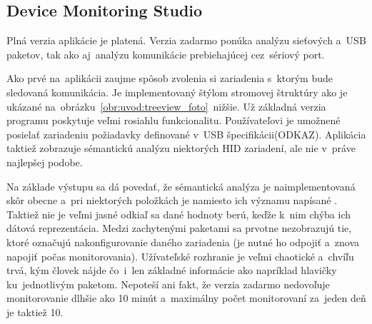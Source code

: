 \subsection*{Device Monitoring Studio}

Plná verzia aplikácie je platená. Verzia zadarmo ponúka analýzu sieťových a~USB paketov, tak ako aj~analýzu komunikácie prebiehajúcej cez~sériový port. 

Ako prvé na~aplikácii zaujme spôsob zvolenia si zariadenia s~ktorým bude sledovaná komunikácia. Je implementovaný štýlom stromovej štruktúry ako je ukázané na~obrázku~\ref{obr:uvod:treeview_foto}~nižšie. Už základná verzia programu poskytuje veľmi rosiahlu funkcionalitu. Používateľovi je umožnené posielať zariadeniu požiadavky definované v~USB špecifikácii(ODKAZ). Aplikácia taktiež zobrazuje sémantickú analýzu niektorých HID zariadení, ale nie v~práve najlepšej podobe. 

Na základe výstupu sa dá povedať, že sémantická analýza je naimplementovaná skôr obecne a~pri niektorých položkách je namiesto ich významu napísané . Taktiež nie je veľmi jasné odkiaľ sa dané hodnoty berú, keďže k~nim chýba ich dátová reprezentácia. Medzi zachytenými paketami sa prvotne nezobrazujú tie, ktoré označujú nakonfigurovanie daného zariadenia (je nutné ho odpojiť a~znova napojiť počas monitorovania). Užívateľské rozhranie je veľmi chaotické a~chvíľu trvá, kým človek nájde čo~i~len základné informácie ako napríklad hlavičky ku~jednotlivým paketom.  Nepoteší ani fakt, že verzia zadarmo nedovoľuje monitorovanie dlhšie ako 10 minút a~maximálny počet monitorovaní za~jeden deň je taktiež 10.

\newpage


